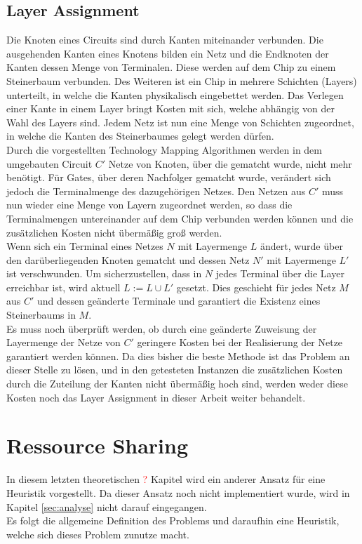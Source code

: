 \documentclass[11pt, a4paper, german]{article}
\newcommand{\TM}{Technology  Mapping }
\begin{document}
\subsection{Layer Assignment}
Die Knoten eines Circuits sind durch Kanten miteinander verbunden.  Die ausgehenden Kanten eines Knotens bilden ein Netz und  die Endknoten der Kanten dessen Menge von Terminalen. Diese werden auf dem Chip zu einem Steinerbaum verbunden. Des Weiteren ist ein Chip in mehrere Schichten (Layers) unterteilt, in welche die Kanten physikalisch eingebettet werden. Das Verlegen einer Kante in einem Layer bringt Kosten mit sich, welche abhängig von der Wahl des Layers sind. Jedem Netz ist nun eine Menge von Schichten zugeordnet, in welche die Kanten des Steinerbaumes gelegt werden dürfen. \\
Durch die vorgestellten \TM Algorithmen  werden in dem umgebauten Circuit $C'$ Netze von Knoten, über die gematcht wurde, nicht mehr benötigt. Für Gates, über deren Nachfolger gematcht wurde, verändert sich jedoch die Terminalmenge des dazugehörigen Netzes. Den Netzen aus $C'$ muss nun wieder eine Menge von Layern zugeordnet werden, so dass die  Terminalmengen untereinander auf dem Chip verbunden werden können und die zusätzlichen Kosten nicht übermäßig groß werden. \\
Wenn sich ein Terminal eines Netzes $N$ mit Layermenge $L$ ändert, wurde über den darüberliegenden Knoten gematcht und dessen Netz $N'$ mit Layermenge $L'$ ist verschwunden. Um sicherzustellen, dass in $N$ jedes Terminal über die Layer erreichbar ist, wird aktuell $L := L \cup L'$ gesetzt. Dies geschieht für jedes Netz $M$ aus $C'$ und dessen geänderte Terminale und garantiert die Existenz eines Steinerbaums in $M$. \\
Es muss noch überprüft werden, ob durch eine geänderte Zuweisung der Layermenge der Netze von $C'$ geringere Kosten bei der Realisierung der Netze garantiert werden können.
Da dies bisher die beste Methode ist das Problem an dieser Stelle zu lösen,  und in den getesteten Instanzen die zusätzlichen Kosten durch die Zuteilung der Kanten nicht übermäßig hoch sind, werden weder diese Kosten noch das Layer Assignment in dieser Arbeit weiter behandelt.
	
	
\section{Ressource Sharing}
In diesem letzten theoretischen \textcolor{red}{?} Kapitel wird ein anderer Ansatz für eine Heuristik vorgestellt. Da dieser Ansatz noch nicht implementiert wurde, wird in Kapitel \ref{sec:analyse} nicht darauf eingegangen.\\
Es folgt die allgemeine Definition des Problems und daraufhin eine Heuristik, welche sich dieses Problem zunutze macht.\\
\end{document}
